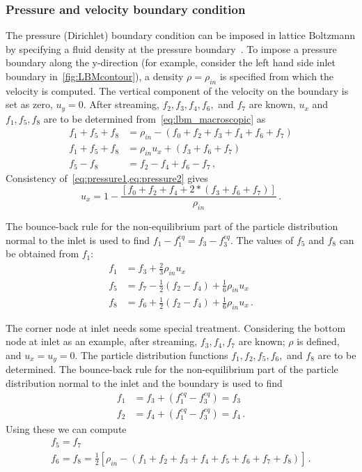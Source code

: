 \subsubsection*{Pressure and velocity boundary condition}

The pressure (Dirichlet) boundary condition can be imposed in 
lattice Boltzmann by specifying a fluid density at the pressure 
boundary~\citep{Zou1997}. To impose a pressure boundary along 
the y-direction (for example, consider the left hand side inlet boundary 
in~\cref{fig:LBMcontour}), a 
density $\rho = \rho_{in}$ is specified from which the velocity is computed. 
The vertical component of the velocity on the boundary is set as zero, $u_y=0$. 
After streaming, $f_2, f_3, f_4, f_6,$ and $f_7$ are known, $u_x$ and $f_1, 
f_5, f_8$ are to be determined from~\cref{eq:lbm_macroscopic} as
%
\begin{align}
 f_1+f_5+f_8 & =  \rho_{in} - (f_0+f_2+f_3+f_4+f_6+f_7) 
 \label{eq:pressure1}\\
 f_1+f_5+f_8 & =  \rho_{in}u_x + (f_3+f_6+f_7) 
 \label{eq:pressure2} \\
 f_5 - f_8  & =  f_2 - f_4 +f_6 -f_7\,,
\end{align}
%
\noindent Consistency of~\cref{eq:pressure1,eq:pressure2} gives
%
\begin{equation}
u_x  = 1 - \frac{[f_0+f_2+f_4+2*(f_3+f_6+f_7)]}{\rho_{in}}\,.
\end{equation}

The bounce-back rule for the non-equilibrium part of the 
particle distribution normal to the inlet is used to find $f_1 
-f_1^{eq} = f_3 -f_3^{eq}$. The values of $f_5$ and $f_8$ can 
be obtained from $f_1$:
%
\begin{align}
f_1 & = f_3 + \frac{2}{3} \rho_{in}u_x \nonumber \\ 
f_5 & = f_7 - \frac{1}{2}(f_2 - f_4) + \frac{1}{6}\rho_{in}u_x\nonumber \\ 
f_8 & = f_6 + \frac{1}{2}(f_2 - f_4) + \frac{1}{6}\rho_{in}u_x\,.
\end{align}

The corner node at inlet needs some special treatment. 
Considering the bottom node at inlet as an example, after 
streaming, $f_3, f_4, f_7$ are known; $\rho$ is 
defined, and $u_x = u_y = 0$. The particle distribution 
functions $f_1, f_2, f_5, f_6, $ and  $f_8$ are to be determined. The 
bounce-back rule for the non-equilibrium part of the particle 
distribution normal to the inlet and the boundary is used to 
find
%
\begin{align}
f_1 & = f_3 + (f_1^{eq}-f_3^{eq}) = f_3 \\
f_2 & = f_4 + (f_1^{eq}-f_3^{eq}) = f_4 \,.
\end{align}
%
\noindent Using these we can compute
%
\begin{gather}
f_5 = f_7 \\
f_6 = f_8 = \frac{1}{2}[\rho_{in} - (f_1 + f_2 + f_3 + f_4 + f_5 + f_6 + f_7 + 
f_8)]\,.
\end{gather}

